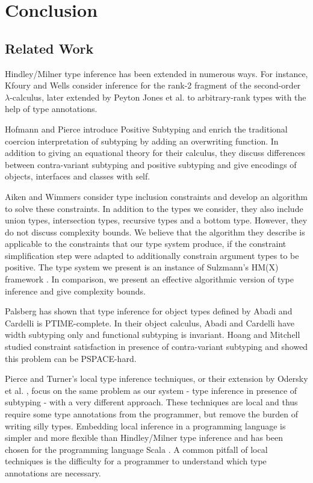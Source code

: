 \documentclass{report}
\begin{document}
  \chapter{Conclusion}
  \section{Related Work}
  Hindley/Milner type inference has been extended in numerous ways. For instance,
  Kfoury and Wells \cite{kfoury:rank2} consider inference for the rank-2 fragment
  of the second-order $\lambda$-calculus, later extended by Peyton Jones et al.
  \cite{peytonjones:rank} to arbitrary-rank types with the help of type annotations.
  
  Hofmann and Pierce \cite{pierce:positive-subtyping} introduce Positive Subtyping
  and enrich the traditional coercion interpretation of subtyping
  by adding an overwriting function. In addition to giving an equational theory
  for their calculus, they discuss differences between contra-variant subtyping
  and positive subtyping and give encodings of objects, interfaces and classes with
  self.
  
  Aiken and Wimmers \cite{aiken:ticti} consider type inclusion
  constraints and develop an algorithm to solve these constraints.
  In addition to the types we consider, they also include union types, intersection types,
  recursive types and a bottom type. However, they do not discuss complexity bounds.
  We believe that the algorithm they describe is applicable to the constraints
  that our type system produce, if the constraint simplification step were
  adapted to additionally constrain argument types to be positive.
  The type system we present is an instance of Sulzmann's HM(X) framework
  \cite{sulzmann97type}. In comparison, we present an effective algorithmic version
  of type inference and give complexity bounds.
  
  Palsberg \cite{palsberg94efficient} has shown that type inference
  for object types defined by Abadi and Cardelli \cite{abadi94theory}
  is PTIME-complete. In their object calculus, Abadi and Cardelli have width subtyping only
  and functional subtyping is invariant.
  Hoang and Mitchell \cite{hoang:lower-bounds} studied constraint satisfaction
  in presence of contra-variant subtyping and showed this problem can be PSPACE-hard.
  
  Pierce and Turner's \cite{PierceTurner:LTI,PierceTurner:LTI-FSUB} local type inference techniques,
  or their extension by Odersky et al. \cite{ozz:colored-local}, focus on the same
  problem as our system - type inference in presence of subtyping - with a very different approach.
  These techniques are local and thus require some type annotations from the programmer,
  but remove the burden of writing silly types. Embedding local inference in
  a programming language is simpler and more flexible than Hindley/Milner type
  inference and has been chosen for the programming language Scala \cite{scala}.
  A common pitfall of local techniques is the difficulty for
  a programmer to understand which type annotations are necessary.
  
\end{document}
